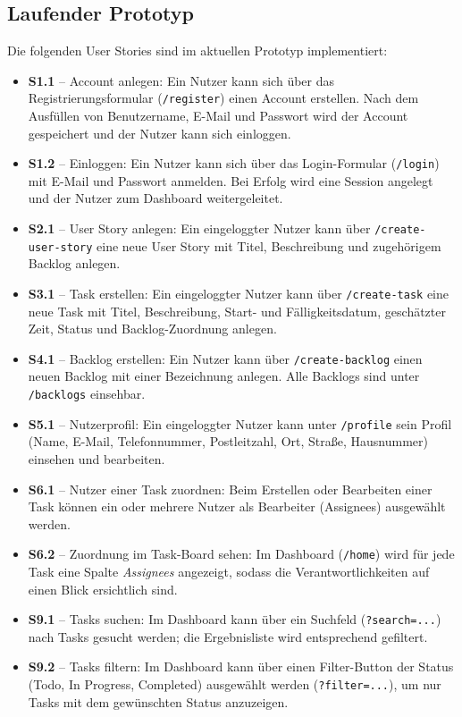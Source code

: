 \documentclass[a4paper,11pt]{article}
\begin{document}
\subsection{Laufender Prototyp}

Die folgenden User Stories sind im aktuellen Prototyp implementiert:

\begin{itemize}
    \item \textbf{S1.1} -- Account anlegen: Ein Nutzer kann sich über das Registrierungsformular (\texttt{/register}) einen Account erstellen. Nach dem Ausfüllen von Benutzername, E-Mail und Passwort wird der Account gespeichert und der Nutzer kann sich einloggen.

    \item \textbf{S1.2} -- Einloggen: Ein Nutzer kann sich über das Login-Formular (\texttt{/login}) mit E-Mail und Passwort anmelden. Bei Erfolg wird eine Session angelegt und der Nutzer zum Dashboard weitergeleitet.

    \item \textbf{S2.1} -- User Story anlegen: Ein eingeloggter Nutzer kann über \texttt{/create-user-story} eine neue User Story mit Titel, Beschreibung und zugehörigem Backlog anlegen.

    \item \textbf{S3.1} -- Task erstellen: Ein eingeloggter Nutzer kann über \texttt{/create-task} eine neue Task mit Titel, Beschreibung, Start- und Fälligkeitsdatum, geschätzter Zeit, Status und Backlog-Zuordnung anlegen.

    \item \textbf{S4.1} -- Backlog erstellen: Ein Nutzer kann über \texttt{/create-backlog} einen neuen Backlog mit einer Bezeichnung anlegen. Alle Backlogs sind unter \texttt{/backlogs} einsehbar.

    \item \textbf{S5.1} -- Nutzerprofil: Ein eingeloggter Nutzer kann unter \texttt{/profile} sein Profil (Name, E-Mail, Telefonnummer, Postleitzahl, Ort, Straße, Hausnummer) einsehen und bearbeiten.

    \item \textbf{S6.1} -- Nutzer einer Task zuordnen: Beim Erstellen oder Bearbeiten einer Task können ein oder mehrere Nutzer als Bearbeiter (Assignees) ausgewählt werden.

    \item \textbf{S6.2} -- Zuordnung im Task-Board sehen: Im Dashboard (\texttt{/home}) wird für jede Task eine Spalte \textit{Assignees} angezeigt, sodass die Verantwortlichkeiten auf einen Blick ersichtlich sind.

    \item \textbf{S9.1} -- Tasks suchen: Im Dashboard kann über ein Suchfeld (\texttt{?search=...}) nach Tasks gesucht werden; die Ergebnisliste wird entsprechend gefiltert.

    \item \textbf{S9.2} -- Tasks filtern: Im Dashboard kann über einen Filter-Button der Status (Todo, In Progress, Completed) ausgewählt werden (\texttt{?filter=...}), um nur Tasks mit dem gewünschten Status anzuzeigen.
\end{itemize}
\end{document}
